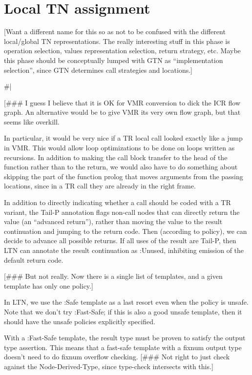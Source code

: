 
\chapter{Local TN assignment}

[Want a different name for this so as not to be confused with the different
local/global TN representations.  The really interesting stuff in this phase is
operation selection, values representation selection, return strategy, etc.
Maybe this phase should be conceptually lumped with GTN as ``implementation
selection'', since GTN determines call strategies and locations.]

\#|

[\#\#\# I guess I believe that it is OK for VMR conversion to dick the ICR flow
graph.  An alternative would be to give VMR its very own flow graph, but that
seems like overkill.

In particular, it would be very nice if a TR local call looked exactly like a
jump in VMR.  This would allow loop optimizations to be done on loops written
as recursions.  In addition to making the call block transfer to the head of
the function rather than to the return, we would also have to do something
about skipping the part of the function prolog that moves arguments from the
passing locations, since in a TR call they are already in the right frame.


In addition to directly indicating whether a call should be coded with a TR
variant, the Tail-P annotation flags non-call nodes that can directly return
the value (an ``advanced return''), rather than moving the value to the result
continuation and jumping to the return code.  Then (according to policy), we
can decide to advance all possible returns.  If all uses of the result are
Tail-P, then LTN can annotate the result continuation as :Unused, inhibiting
emission of the default return code.

[\#\#\# But not really.  Now there is a single list of templates, and a given
template has only one policy.]

In LTN, we use the :Safe template as a last resort even when the policy is
unsafe.  Note that we don't try :Fast-Safe; if this is also a good unsafe
template, then it should have the unsafe policies explicitly specified.

With a :Fast-Safe template, the result type must be proven to satisfy the
output type assertion.  This means that a fast-safe template with a fixnum
output type doesn't need to do fixnum overflow checking.  [\#\#\# Not right to
just check against the Node-Derived-Type, since type-check intersects with
this.]

